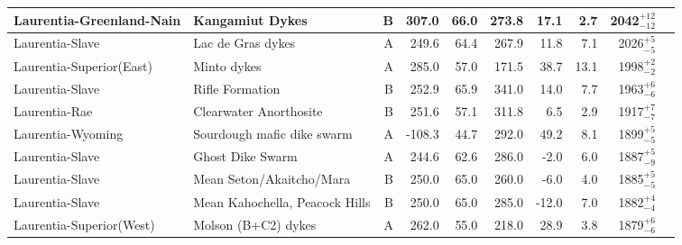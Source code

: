 \begin{longtable}{p{1 in}p{1 in}rrrrrrrp{1.5 in}}
      Laurentia-Greenland-Nain &                                  Kangamiut Dykes &      B &     307.0 &      66.0 & 273.8 &  17.1 &       2.7 &   2042$^{+12}_{-12}$ &                                 \cite{Fahrig1976b} \\ \hline
               Laurentia-Slave &                                Lac de Gras dykes &      A &     249.6 &      64.4 & 267.9 &  11.8 &       7.1 &     2026$^{+5}_{-5}$ &                                 \cite{Buchan2009a} \\ \hline
      Laurentia-Superior(East) &                                      Minto dykes &      A &     285.0 &      57.0 & 171.5 &  38.7 &      13.1 &     1998$^{+2}_{-2}$ &                                  \cite{Evans2010a} \\ \hline
               Laurentia-Slave &                                  Rifle Formation &      B &     252.9 &      65.9 & 341.0 &  14.0 &       7.7 &     1963$^{+6}_{-6}$ &                                  \cite{Evans1981a} \\ \hline
                 Laurentia-Rae &                           Clearwater Anorthosite &      B &     251.6 &      57.1 & 311.8 &   6.5 &       2.9 &     1917$^{+7}_{-7}$ &                                  \cite{Halls1999a} \\ \hline
             Laurentia-Wyoming &                       Sourdough mafic dike swarm &      A &    -108.3 &      44.7 & 292.0 &  49.2 &       8.1 &     1899$^{+5}_{-5}$ &                                 \cite{Kilian2016b} \\ \hline
               Laurentia-Slave &                                 Ghost Dike Swarm &      A &     244.6 &      62.6 & 286.0 &  -2.0 &       6.0 &     1887$^{+5}_{-9}$ &                                 \cite{Buchan2016a} \\ \hline
               Laurentia-Slave &                         Mean Seton/Akaitcho/Mara &      B &     250.0 &      65.0 & 260.0 &  -6.0 &       4.0 &     1885$^{+5}_{-5}$ &                               \cite{Mitchell2010c} \\ \hline
               Laurentia-Slave &                   Mean Kahochella, Peacock Hills &      B &     250.0 &      65.0 & 285.0 & -12.0 &       7.0 &     1882$^{+4}_{-4}$ &                               \cite{Mitchell2010c} \\ \hline
      Laurentia-Superior(West) &                              Molson (B+C2) dykes &      A &     262.0 &      55.0 & 218.0 &  28.9 &       3.8 &     1879$^{+6}_{-6}$ &                                  \cite{Evans2010a} \\ \hline

\end{longtable}

